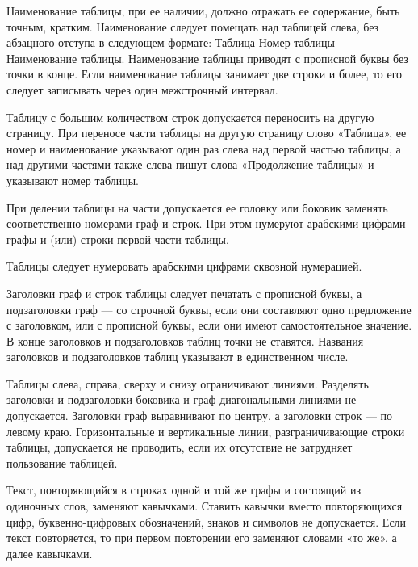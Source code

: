 \documentclass[a4paper,12pt]{article}
\begin{document}
\hspace{15pt}Наименование таблицы, при ее наличии, должно отражать ее содержание, быть точным, кратким. Наименование следует помещать над таблицей слева, без абзацного отступа в следующем формате: Таблица Номер таблицы — Наименование таблицы. Наименование таблицы приводят с прописной буквы без точки в конце. Если наименование таблицы занимает две строки и более, то его следует записывать через один межстрочный интервал.

\hspace{15pt}Таблицу с большим количеством строк допускается переносить на другую страницу. При переносе части таблицы на другую страницу слово «Таблица», ее номер и наименование указывают один раз слева над первой частью таблицы, а над другими частями также слева пишут слова «Продолжение таблицы» и указывают номер таблицы.

\hspace{15pt}При делении таблицы на части допускается ее головку или боковик заменять соответственно номерами граф и строк. При этом нумеруют арабскими цифрами графы и (или) строки первой части таблицы.

\hspace{15pt}Таблицы следует нумеровать арабскими цифрами сквозной нумерацией.

\hspace{15pt}Заголовки граф и строк таблицы следует печатать с прописной буквы, а подзаголовки граф — со строчной буквы, если они составляют одно предложение с заголовком, или с прописной буквы, если они имеют самостоятельное значение. В конце заголовков и подзаголовков таблиц точки не ставятся. Названия заголовков и подзаголовков таблиц указывают в единственном числе.

\hspace{15pt}Таблицы слева, справа, сверху и снизу ограничивают линиями. Разделять заголовки и подзаголовки боковика и граф диагональными линиями не допускается. Заголовки граф выравнивают по центру, а заголовки строк — по левому краю. Горизонтальные и вертикальные линии, разграничивающие строки таблицы, допускается не проводить, если их отсутствие не затрудняет пользование таблицей.

\hspace{15pt}Текст, повторяющийся в строках одной и той же графы и состоящий из одиночных слов, заменяют кавычками. Ставить кавычки вместо повторяющихся цифр, буквенно-цифровых обозначений, знаков и символов не допускается. Если текст повторяется, то при первом повторении его заменяют словами «то же», а далее кавычками.
\end{document}
